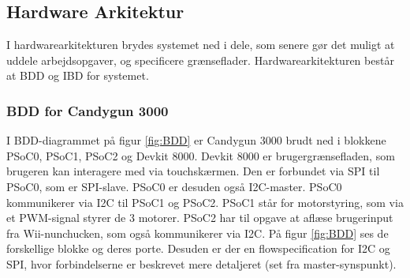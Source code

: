 \subsection{Hardware Arkitektur}
I hardwarearkitekturen brydes systemet ned i dele, som senere gør det muligt at uddele arbejdsopgaver, og specificere grænseflader. Hardwarearkitekturen består at BDD og IBD for systemet.

\subsubsection{BDD for Candygun 3000}
I BDD-diagrammet på figur \ref{fig:BDD} er Candygun 3000 brudt ned i blokkene PSoC0, PSoC1, PSoC2 og Devkit 8000. Devkit 8000 er brugergrænsefladen, som brugeren kan interagere med via touchskærmen. Den er forbundet via SPI til PSoC0, som er SPI-slave. PSoC0 er desuden også I2C-master. PSoC0 kommunikerer via I2C til PSoC1 og PSoC2. PSoC1 står for motorstyring, som via et PWM-signal styrer de 3 motorer. PSoC2 har til opgave at aflæse brugerinput fra Wii-nunchucken, som også kommunikerer via I2C. På figur \ref{fig:BDD} ses de forskellige blokke og deres porte. Desuden er der en flowspecification for I2C og SPI, hvor forbindelserne er beskrevet mere detaljeret (set fra master-synspunkt). 

